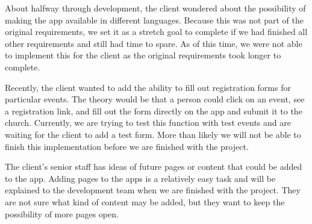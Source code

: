 \documentclass[letterpaper,10pt,draftclsnofoot,onecolumn,titlepage]{IEEEtran}
\begin{document}
		About halfway through development, the client wondered about the possibility of making the app available in different languages. 
		Because this was not part of the original requirements, we set it as a stretch goal to complete if we had finished all other requirements and still had time to spare. 
		As of this time, we were not able to implement this for the client as the original requirements took longer to complete. 
		
		Recently, the client wanted to add the ability to fill out registration forms for particular events. 
		The theory would be that a person could click on an event, see a registration link, and fill out the form directly on the app and submit it to the church. 
		Currently, we are trying to test this function with test events and are waiting for the client to add a test form. 
		More than likely we will not be able to finish this implementation before we are finished with the project. 
		
		The client's senior staff has ideas of future pages or content that could be added to the app. 
		Adding pages to the apps is a relatively easy task and will be explained to the development team when we are finished with the project. 
		They are not sure what kind of content may be added, but they want to keep the possibility of more pages open.
		
	




	
\end{document}
